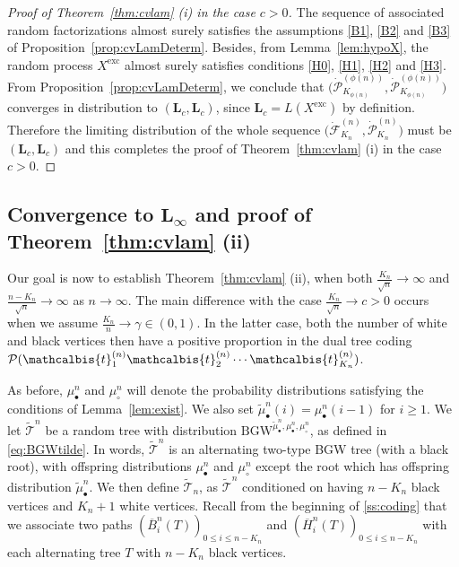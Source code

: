 \documentclass[10pt]{amsart}
\theoremstyle{definition}\newtheorem{defi}[theo]{Definition}\newtheorem{rema}[theo]{Remark}\newtheorem{exam}[theo]{Example}\newtheorem{exem}[theo]{Example}\newtheorem{nota}[theo]{Notation}
\def\PPP{\mathcal P}
\def\dFKn{\dot{\mathcal{F}}^{(n)}_{K_{n}}}
\def\dPKn{\dot{\mathcal{P}}^{(n)}_{K_{n}}}
\def\dFKphin{\dot{\mathcal{F}}^{(\phi(n))}_{K_{\phi(n)}}}
\def\dPKphin{\dot{\mathcal{F}}^{(\phi(n))}_{K_{\phi(n)}}}
\def\dFKphin{\dot{\mathcal{P}}^{(\phi(n))}_{K_{\phi(n)}}}
\def\dPKphin{\dot{\mathcal{P}}^{(\phi(n))}_{K_{\phi(n)}}}
\def\mubn{\mu_{\bullet}^{n}}
\def\mucn{\mu_{\circ}^{n}}
\def\oB{\overline{B}}
\def\oH{\overline{H}}
\def \Xexc{X^{\mathrm{exc}}}
\def\tTs{\tilde{\Ts}}
\newcommand\BGW{\textrm{BGW}}
\def\tb{\mathcalbis{t}}
\def\Ts{\mathscr{T}}
\begin{document}
\begin{proof}[Proof of Theorem~\ref{thm:cvlam} (i) in the case $c>0$]
  The sequence of associated random factorizations almost surely satisfies the assumptions
  \ref{B1}, \ref{B2} and \ref{B3} of Proposition~\ref{prop:cvLamDeterm}.
  Besides, from Lemma~\ref{lem:hypoX}, the random process $\Xexc$ almost surely
  satisfies conditions \ref{H0}, \ref{H1}, \ref{H2} and \ref{H3}.
  From Proposition~\ref{prop:cvLamDeterm},
   we conclude that $\big( \dFKphin  ,  \dPKphin \big)$ converges in distribution
   to $(\mathbf{L}_c,\mathbf{L}_c)$, since $\mathbf{L}_c=L(\Xexc)$ by definition.
  Therefore the limiting distribution of the whole sequence $\big( \dFKn, \dPKn\big)$
  must be $(\mathbf{L}_c,\mathbf{L}_c)$ and this completes the proof of Theorem~\ref{thm:cvlam} (i) in the case $c>0$.
\end{proof}


\subsection{Convergence to \texorpdfstring{$\mathbf{L}_{\infty}$}{L infinity} and proof of Theorem~\ref{thm:cvlam} (ii)}
\label{sec:Linfty}

Our goal is now to establish Theorem~\ref{thm:cvlam} (ii), when  both $\frac{K_{n}}{\sqrt{n}} \rightarrow \infty$ and  $ \frac{n-K_{n}}{\sqrt{n}} \rightarrow \infty$ as $n \rightarrow \infty$.
The main difference  with the case $ \frac{K_{n}}{\sqrt{n}}  \rightarrow c>0$ occurs when we assume $ \tfrac{K_{n}}{n} \rightarrow \gamma \in (0,1)$.
In the latter case,  both the  number of white and black vertices then have a positive proportion in the dual tree coding $ \PPP(\tb_{1}^{(n)}\tb_{2}^{(n)} \cdots \tb_{K_{n}}^{(n)}) $.


As before, $\mubn$ and $\mucn$  will denote the probability distributions satisfying the conditions of Lemma~\ref{lem:exist}.
We also set $\widetilde{\mu}^{n}_{\bullet}(i)=\mubn(i-1)$ for $i \geq 1$.
We let $\tilde{\Ts}^{n}$ be a random tree with distribution ${\BGW}^{\widetilde{\mu}_{\bullet}^{n},\mubn,\mucn}$, as defined in \eqref{eq:BGWtilde}.
In words, $\tilde{\Ts}^{n}$ is
 an alternating two-type BGW tree (with a black root), with offspring distributions $\mubn$ and $\mucn$ except the root which has offspring distribution $\widetilde{\mu}^{n}_{\bullet}$.
We then define $\tTs_n$, as $\tTs^{n}$ conditioned on having $n-K_{n}$ black vertices and $K_{n}+1$ white vertices.
Recall from the beginning of \cref{ss:coding} that we associate
two paths $(\oB^{n}_{i}(T))_{0 \leq i \leq n-K_{n}}$ and  $(\oH^{n}_{i}(T))_{0 \leq i \leq n-K_{n}}$ with each alternating tree $T$
with $n-K_n$ black vertices.
\end{document}

